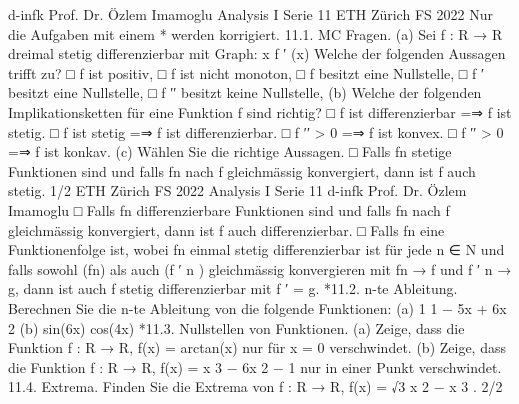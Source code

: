 d-infk
Prof. Dr. Özlem Imamoglu
Analysis I
Serie 11
ETH Zürich
FS 2022
Nur die Aufgaben mit einem * werden korrigiert.
11.1. MC Fragen.
(a) Sei f : R → R dreimal stetig differenzierbar mit Graph:
x
f
′
(x)
Welche der folgenden Aussagen trifft zu?
□ f ist positiv,
□ f ist nicht monoton,
□ f besitzt eine Nullstelle,
□ f
′ besitzt eine Nullstelle,
□ f
′′ besitzt keine Nullstelle,
(b) Welche der folgenden Implikationsketten für eine Funktion f sind richtig?
□ f ist differenzierbar =⇒ f ist stetig.
□ f ist stetig =⇒ f ist differenzierbar.
□ f
′′ > 0 =⇒ f ist konvex.
□ f
′′ > 0 =⇒ f ist konkav.
(c) Wählen Sie die richtige Aussagen.
□ Falls fn stetige Funktionen sind und falls fn nach f gleichmässig konvergiert,
dann ist f auch stetig.
1/2
ETH Zürich
FS 2022
Analysis I
Serie 11
d-infk
Prof. Dr. Özlem Imamoglu
□ Falls fn differenzierbare Funktionen sind und falls fn nach f gleichmässig
konvergiert, dann ist f auch differenzierbar.
□ Falls fn eine Funktionenfolge ist, wobei fn einmal stetig differenzierbar ist
für jede n ∈ N und falls sowohl (fn) als auch (f
′
n
) gleichmässig konvergieren
mit fn → f und f
′
n → g, dann ist auch f stetig differenzierbar mit f
′ = g.
*11.2. n-te Ableitung. Berechnen Sie die n-te Ableitung von die folgende Funktionen:
(a) 1
1 − 5x + 6x
2
(b) sin(6x) cos(4x)
*11.3. Nullstellen von Funktionen.
(a) Zeige, dass die Funktion f : R → R, f(x) = arctan(x) nur für x = 0 verschwindet.
(b) Zeige, dass die Funktion f : R → R, f(x) = x
3 − 6x
2 − 1 nur in einer Punkt
verschwindet.
11.4. Extrema. Finden Sie die Extrema von
f : R → R, f(x) = √3
x
2 − x
3
.
2/2
